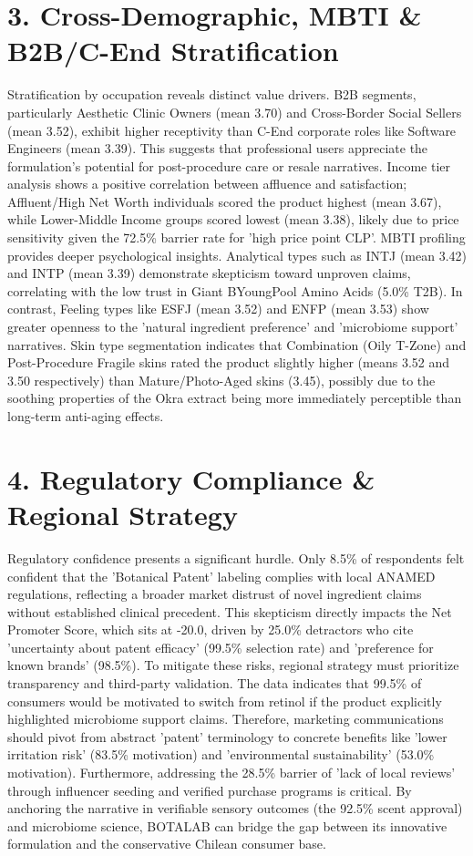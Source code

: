 \documentclass[10pt,twocolumn,a4paper]{article}
\begin{document}
\section{3. Cross-Demographic, MBTI \& B2B/C-End Stratification}
Stratification by occupation reveals distinct value drivers. B2B segments, particularly Aesthetic Clinic Owners (mean 3.70) and Cross-Border Social Sellers (mean 3.52), exhibit higher receptivity than C-End corporate roles like Software Engineers (mean 3.39). This suggests that professional users appreciate the formulation's potential for post-procedure care or resale narratives. Income tier analysis shows a positive correlation between affluence and satisfaction; Affluent/High Net Worth individuals scored the product highest (mean 3.67), while Lower-Middle Income groups scored lowest (mean 3.38), likely due to price sensitivity given the 72.5\% barrier rate for 'high price point CLP'. MBTI profiling provides deeper psychological insights. Analytical types such as INTJ (mean 3.42) and INTP (mean 3.39) demonstrate skepticism toward unproven claims, correlating with the low trust in Giant BYoungPool Amino Acids (5.0\% T2B). In contrast, Feeling types like ESFJ (mean 3.52) and ENFP (mean 3.53) show greater openness to the 'natural ingredient preference' and 'microbiome support' narratives. Skin type segmentation indicates that Combination (Oily T-Zone) and Post-Procedure Fragile skins rated the product slightly higher (means 3.52 and 3.50 respectively) than Mature/Photo-Aged skins (3.45), possibly due to the soothing properties of the Okra extract being more immediately perceptible than long-term anti-aging effects.
\section{4. Regulatory Compliance \& Regional Strategy}
Regulatory confidence presents a significant hurdle. Only 8.5\% of respondents felt confident that the 'Botanical Patent' labeling complies with local ANAMED regulations, reflecting a broader market distrust of novel ingredient claims without established clinical precedent. This skepticism directly impacts the Net Promoter Score, which sits at -20.0, driven by 25.0\% detractors who cite 'uncertainty about patent efficacy' (99.5\% selection rate) and 'preference for known brands' (98.5\%). To mitigate these risks, regional strategy must prioritize transparency and third-party validation. The data indicates that 99.5\% of consumers would be motivated to switch from retinol if the product explicitly highlighted microbiome support claims. Therefore, marketing communications should pivot from abstract 'patent' terminology to concrete benefits like 'lower irritation risk' (83.5\% motivation) and 'environmental sustainability' (53.0\% motivation). Furthermore, addressing the 28.5\% barrier of 'lack of local reviews' through influencer seeding and verified purchase programs is critical. By anchoring the narrative in verifiable sensory outcomes (the 92.5\% scent approval) and microbiome science, BOTALAB can bridge the gap between its innovative formulation and the conservative Chilean consumer base.
\end{document}
